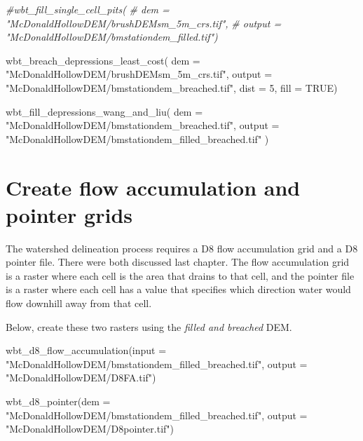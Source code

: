 \documentclass[
]{book}
\newenvironment{Shaded}{\begin{snugshade}}{\end{snugshade}}
\newcommand{\AttributeTok}[1]{\textcolor[rgb]{0.77,0.63,0.00}{#1}}
\newcommand{\CommentTok}[1]{\textcolor[rgb]{0.56,0.35,0.01}{\textit{#1}}}
\newcommand{\ConstantTok}[1]{\textcolor[rgb]{0.00,0.00,0.00}{#1}}
\newcommand{\DecValTok}[1]{\textcolor[rgb]{0.00,0.00,0.81}{#1}}
\newcommand{\FunctionTok}[1]{\textcolor[rgb]{0.00,0.00,0.00}{#1}}
\newcommand{\NormalTok}[1]{#1}
\newcommand{\StringTok}[1]{\textcolor[rgb]{0.31,0.60,0.02}{#1}}
\begin{document}
\begin{Shaded}
\begin{Highlighting}[]
\CommentTok{\#wbt\_fill\_single\_cell\_pits(}
\CommentTok{\#                    dem = "McDonaldHollowDEM/brushDEMsm\_5m\_crs.tif",}
 \CommentTok{\#                   output = "McDonaldHollowDEM/bmstationdem\_filled.tif")}

\FunctionTok{wbt\_breach\_depressions\_least\_cost}\NormalTok{(}
  \AttributeTok{dem =} \StringTok{"McDonaldHollowDEM/brushDEMsm\_5m\_crs.tif"}\NormalTok{,}
  \AttributeTok{output =} \StringTok{"McDonaldHollowDEM/bmstationdem\_breached.tif"}\NormalTok{,}
  \AttributeTok{dist =} \DecValTok{5}\NormalTok{,}
  \AttributeTok{fill =} \ConstantTok{TRUE}\NormalTok{)}

\FunctionTok{wbt\_fill\_depressions\_wang\_and\_liu}\NormalTok{(}
  \AttributeTok{dem =} \StringTok{"McDonaldHollowDEM/bmstationdem\_breached.tif"}\NormalTok{,}
  \AttributeTok{output =} \StringTok{"McDonaldHollowDEM/bmstationdem\_filled\_breached.tif"}
\NormalTok{)}
\end{Highlighting}
\end{Shaded}

\hypertarget{create-flow-accumulation-and-pointer-grids}{%
\section{Create flow accumulation and pointer grids}\label{create-flow-accumulation-and-pointer-grids}}

The watershed delineation process requires a D8 flow accumulation grid and a D8 pointer file. There were both discussed last chapter. The flow accumulation grid is a raster where each cell is the area that drains to that cell, and the pointer file is a raster where each cell has a value that specifies which direction water would flow downhill away from that cell.

Below, create these two rasters using the \emph{filled and breached} DEM.

\begin{Shaded}
\begin{Highlighting}[]
\FunctionTok{wbt\_d8\_flow\_accumulation}\NormalTok{(}\AttributeTok{input =} \StringTok{"McDonaldHollowDEM/bmstationdem\_filled\_breached.tif"}\NormalTok{,}
                         \AttributeTok{output =} \StringTok{"McDonaldHollowDEM/D8FA.tif"}\NormalTok{)}

\FunctionTok{wbt\_d8\_pointer}\NormalTok{(}\AttributeTok{dem =} \StringTok{"McDonaldHollowDEM/bmstationdem\_filled\_breached.tif"}\NormalTok{,}
               \AttributeTok{output =} \StringTok{"McDonaldHollowDEM/D8pointer.tif"}\NormalTok{)}
\end{Highlighting}
\end{Shaded}
\end{document}
